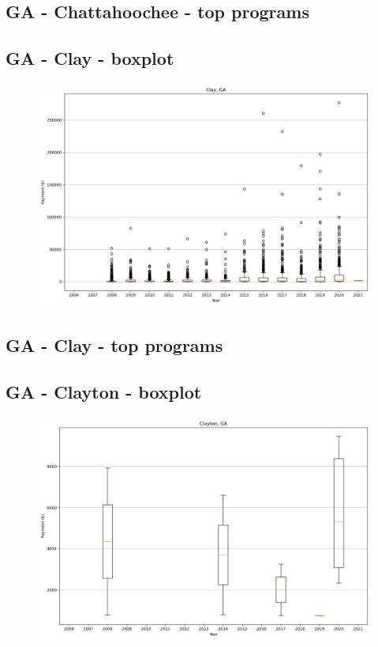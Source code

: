 \subsection*{GA - Chattahoochee - top programs}

\newpage
\subsection*{GA - Clay - boxplot}
\begin{figure}[h]
\centering
\includegraphics[width=7in]{../output/boxplots/counties/Clay-GA_boxplot.png}
\end{figure}


\subsection*{GA - Clay - top programs}

\newpage
\subsection*{GA - Clayton - boxplot}
\begin{figure}[h]
\centering
\includegraphics[width=7in]{../output/boxplots/counties/Clayton-GA_boxplot.png}
\end{figure}


